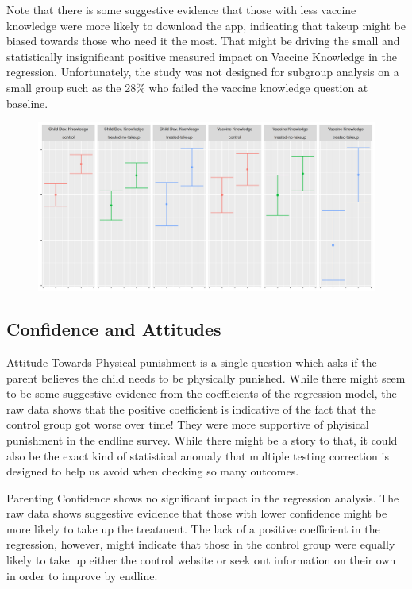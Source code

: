 \documentclass{article}
\begin{document}
Note that there is some suggestive evidence that those with less vaccine knowledge were more likely to download the app, indicating that takeup might be biased towards those who need it the most. That might be driving the small and statistically insignificant positive measured impact on Vaccine Knowledge in the regression. Unfortunately, the study was not designed for subgroup analysis on a small group such as the 28\% who failed the vaccine knowledge question at baseline.
\begin{figure}[H]
  \centering
\includegraphics[width=\textwidth]{plots/pre_post/Pooled: Vaccine Knowledge.png}
\end{figure}


\subsection*{Confidence and Attitudes}

Attitude Towards Physical punishment is a single question which asks if the parent believes the child needs to be physically punished. While there might seem to be some suggestive evidence from the coefficients of the regression model, the raw data shows that the positive coefficient is indicative of the fact that the control group got worse over time! They were more supportive of phyisical punishment in the endline survey. While there might be a story to that, it could also be the exact kind of statistical anomaly that multiple testing correction is designed to help us avoid when checking so many outcomes.

Parenting Confidence shows no significant impact in the regression analysis. The raw data shows suggestive evidence that those with lower confidence might be more likely to take up the treatment. The lack of a positive coefficient in the regression, however, might indicate that those in the control group were equally likely to take up either the control website or seek out information on their own in order to improve by endline.
\end{document}
